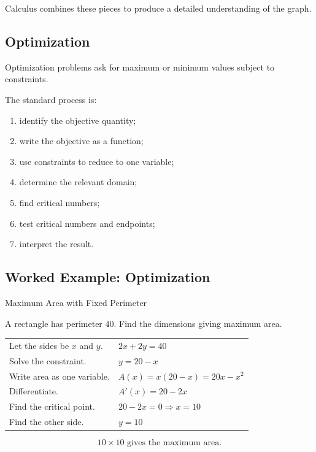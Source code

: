 Calculus combines these pieces to produce a detailed understanding of the
graph.

\subsection{Optimization}
\label{subsec:optimization-calculus}

Optimization problems ask for maximum or minimum values subject to
constraints.

The standard process is:

\begin{enumerate}
    \item identify the objective quantity;
    \item write the objective as a function;
    \item use constraints to reduce to one variable;
    \item determine the relevant domain;
    \item find critical numbers;
    \item test critical numbers and endpoints;
    \item interpret the result.
\end{enumerate}

\subsection{Worked Example: Optimization}
\label{subsec:worked-optimization}

\begin{workedexamplebox}{Maximum Area with Fixed Perimeter}

A rectangle has perimeter \(40\). Find the dimensions giving maximum area.

\begin{tabularx}{\textwidth}{@{}>{\raggedright\arraybackslash}p{}X@{}}
Let the sides be \(x\) and \(y\). &
\(2x+2y=40\)\\
Solve the constraint. &
\(y=20-x\)\\
Write area as one variable. &
\(A(x)=x(20-x)=20x-x^2\)\\
Differentiate. &
\(A'(x)=20-2x\)\\
Find the critical point. &
\(20-2x=0\Rightarrow x=10\)\\
Find the other side. &
\(y=10\)
\end{tabularx}

\begin{answerbox}
\[ \boxed{10\times10\text{ gives the maximum area.}} \]
\end{answerbox}
\end{workedexamplebox}


